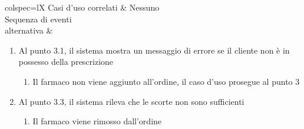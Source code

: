 \begin{table}[!hbp]
\begin{scenery}{colspec=lX}
		Casi d'uso correlati & Nessuno \\
		{Sequenza di eventi \\ alternativa} &
			\begin{enumerate}
				\item Al punto 3.1, il sistema mostra un messaggio di errore se il cliente non è in possesso della prescrizione
				\begin{enumerate}[label*=\arabic*.]
					\item Il farmaco non viene aggiunto all'ordine, il caso d'uso prosegue al punto 3
				\end{enumerate}
				\item Al punto 3.3, il sistema rileva che le scorte non sono sufficienti
					\begin{enumerate}[label*=\arabic*.]
						\item Il farmaco viene rimosso dall'ordine
					\end{enumerate}
			\end{enumerate} \\
	\end{scenery}
\end{table}
